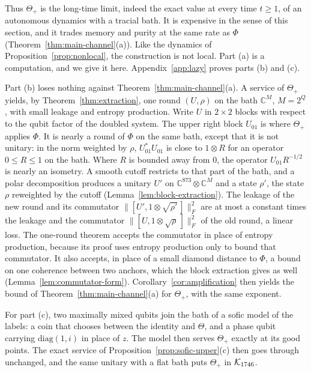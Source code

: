 Thus $\Theta_+$ is the long-time limit, indeed the exact value at every time $t\ge1$, of an autonomous dynamics with a tracial bath. It is
expensive in the sense of this section, and it trades memory and purity at the same rate as $\Phi$ (Theorem~\ref{thm:main-channel}(a)). Like
the dynamics of Proposition~\ref{prop:nonlocal}, the construction is not local. Part (a) is a computation, and we give it here.
Appendix~\ref{app:lazy} proves parts (b) and (c).

Part (b) loses nothing against Theorem~\ref{thm:main-channel}(a). A service of $\Theta_+$ yields, by Theorem~\ref{thm:extraction}, one round
$(U,\rho)$ on the bath $\mathbb C^M$, $M=2^Q$, with small leakage and entropy production. Write $U$ in $2\times2$ blocks with respect to the
qubit factor of the doubled system. The upper right block $U_{01}$ is where $\Theta_+$ applies $\Phi$. It is nearly a round of $\Phi$ on the same
bath, except that it is not unitary: in the norm weighted by $\rho$, $U_{01}^*U_{01}$ is close to $1\otimes R$ for an operator $0\le R\le1$ on the bath. Where $R$ is bounded away from $0$, the operator $U_{01}R^{-1/2}$ is nearly an isometry. A smooth cutoff restricts to that part of the bath,
and a polar decomposition produces a unitary $U'$ on $\mathbb C^{873}\otimes\mathbb C^M$ and a state $\rho'$, the state $\rho$ reweighted by the
cutoff (Lemma~\ref{lem:block-extraction}). The leakage of the new round and its commutator $\|[U',1\otimes\sqrt{\rho'}\,]\|_F^2$ are at most a
constant times the leakage and the commutator $\|[U,1\otimes\sqrt\rho\,]\|_F^2$ of the old round, a linear loss. The one-round theorem accepts
the commutator in place of entropy production, because its proof uses entropy production only to bound that commutator. It also accepts, in
place of a small diamond distance to $\Phi$, a bound on one coherence between two anchors, which the block extraction gives as well
(Lemma~\ref{lem:commutator-form}). Corollary~\ref{cor:amplification} then yields the bound of Theorem~\ref{thm:main-channel}(a) for $\Theta_+$,
with the same exponent.

For part (c), two maximally mixed qubits join the bath of a sofic model of the labels: a coin that chooses between the identity and $\Theta$,
and a phase qubit carrying $\mathrm{diag}(1,i)$ in place of $z$. The model then serves $\Theta_+$ exactly at its good points. The exact service of
Proposition~\ref{prop:sofic-upper}(c) then goes through unchanged, and the same unitary with a flat bath puts $\Theta_+$ in $\mathcal K_{1746}$.

